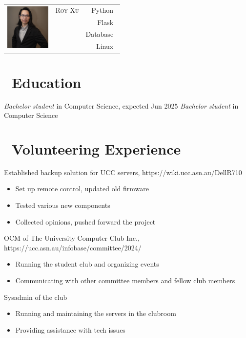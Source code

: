 \documentclass{resume}
\begin{document}

{
\Large{
  \begin{tabu}{ c l r }
    & \scshape{Roy Xu} & {Python~} \\
    &  & {Flask~} \\
    &   & {Database~}\\
    &   & {Linux~} 
  \end{tabu}
}
}

\section{\faGraduationCap\ Education}
\textit{Bachelor student} in Computer Science, expected Jun 2025
\textit{Bachelor student} in Computer Science

\section{\faUsers\ Volunteering Experience}
Established backup solution for UCC servers, https://wiki.ucc.asn.au/DellR710
\begin{itemize}
  \item Set up remote control, updated old firmware
  \item Tested various new components
  \item Collected opinions, pushed forward the project
\end{itemize}


OCM of The University Computer Club Inc., https://ucc.asn.au/infobase/committee/2024/
\begin{itemize}
  \item Running the student club and organizing events
  \item Communicating with other committee members and fellow club members 
\end{itemize}
Sysadmin of the club
\begin{itemize}
  \item Running and maintaining the servers in the clubroom
  \item Providing assistance with tech issues
\end{itemize}
\end{document}

